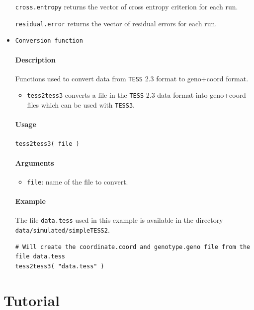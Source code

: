 \documentclass[10pt,a4paper]{article}
\begin{document}
\begin{itemize}
\verb|cross.entropy| returns the vector of cross entropy criterion for each run.

\verb|residual.error| returns the vector of residual errors for each run.

\item \verb|Conversion function|

\paragraph{Description}
Functions used to convert data from {\tt TESS} 2.3 format to geno+coord format.

\begin{itemize}
  \item[] \verb|tess2tess3| converts a file in the {\tt TESS} 2.3 data format into geno+coord files which can be used with {\tt TESS3}.
\end{itemize}

\paragraph{Usage}
\begin{verbatim}
tess2tess3( file )
\end{verbatim}
\paragraph{Arguments}
\begin{itemize}
\item \verb|file|: name of the file to convert.
\end{itemize}

\paragraph{Example}
The file {\tt data.tess} used in this example is available in the directory {\tt data/simulated/simpleTESS2}.
\begin{verbatim}
# Will create the coordinate.coord and genotype.geno file from the file data.tess
tess2tess3( "data.tess" ) 
\end{verbatim}

\end{itemize}





\section{Tutorial}
\end{document}
